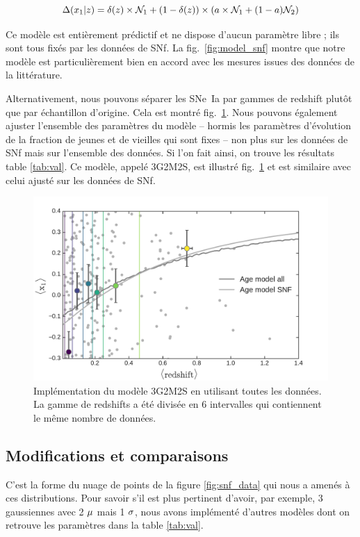 \documentclass[a4paper, 12pt, svgnames]{article}
\begin{document}
\begin{equation}
    \Delta(x_1 | z) = \delta(z) \times\mathcal{N}_1 + \left(1-\delta(z)\right)\times \left(a\times\mathcal{N}_1 + (1-a) \mathcal{N}_2\right)
\end{equation}

Ce modèle est entièrement prédictif et ne dispose d'aucun paramètre libre ; ils
sont tous fixés par les données de SNf. La fig.~\ref{fig:model_snf} montre que
notre modèle est particulièrement bien en accord avec les mesures issues des
données de la littérature. \bigbreak

Alternativement, nous pouvons séparer les SNe~Ia par gammes de redshift plutôt
que par échantillon d'origine. Cela est montré fig.~\ref{fig:3G2M2S}. Nous
pouvons également ajuster l'ensemble des paramètres du modèle -- hormis les
paramètres d'évolution de la fraction de jeunes et de vieilles qui sont fixes --
non plus sur les données de SNf mais sur l'ensemble des données. Si l'on fait
ainsi, on trouve les résultats table \ref{tab:val}. Ce modèle, appelé 3G2M2S,
est illustré fig.~\ref{fig:3G2M2S} et est similaire avec celui ajusté sur les
données de SNf.

\begin{figure}[htbp!]
    \centering
    \includegraphics[width=.5\linewidth]{Rapport_figures/model_all.pdf}
    \captionsetup{justification=centering}
    \caption{Implémentation du modèle 3G2M2S en utilisant toutes les données.
    La gamme de redshifts a été divisée en 6 intervalles qui contiennent le même
nombre de données.}
    \label{fig:3G2M2S}
\end{figure}

\subsection{Modifications et comparaisons}\label{ssec:comp}

C'est la forme du nuage de points de la figure \ref{fig:snf_data} qui nous a
amenés à ces distributions. Pour savoir s'il est plus pertinent d'avoir, par
exemple, 3 gaussiennes avec 2 $\mu$ mais 1 $\sigma$, nous avons implémenté d'autres
modèles dont on retrouve les paramètres dans la table \ref{tab:val}. \bigbreak
\end{document}
